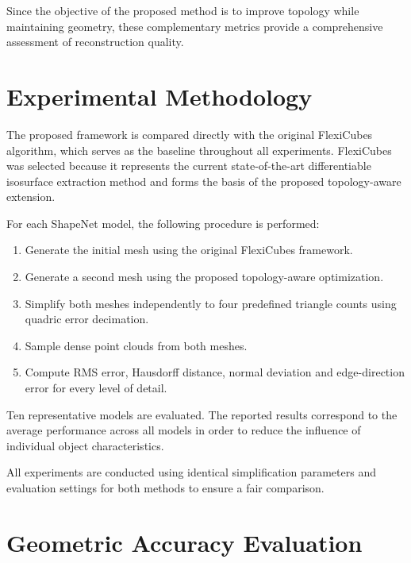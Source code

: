 \documentclass[../main.tex]{subfiles}
\begin{document}
Since the objective of the proposed method is to improve topology while maintaining geometry, these complementary metrics provide a comprehensive assessment of reconstruction quality.


\section{Experimental Methodology}

The proposed framework is compared directly with the original FlexiCubes algorithm, which serves as the baseline throughout all experiments. FlexiCubes was selected because it represents the current state-of-the-art differentiable isosurface extraction method and forms the basis of the proposed topology-aware extension.

For each ShapeNet model, the following procedure is performed:

\begin{enumerate}
	
	\item Generate the initial mesh using the original FlexiCubes framework.
	
	\item Generate a second mesh using the proposed topology-aware optimization.
	
	\item Simplify both meshes independently to four predefined triangle counts using quadric error decimation.
	
	\item Sample dense point clouds from both meshes.
	
	\item Compute RMS error, Hausdorff distance, normal deviation and edge-direction error for every level of detail.
	
\end{enumerate}

Ten representative models are evaluated. The reported results correspond to the average performance across all models in order to reduce the influence of individual object characteristics.

All experiments are conducted using identical simplification parameters and evaluation settings for both methods to ensure a fair comparison.

\section{Geometric Accuracy Evaluation}
\end{document}
